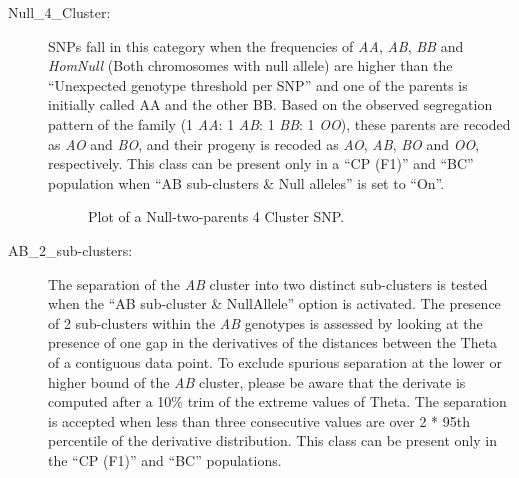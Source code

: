\documentclass[a4paper,11pt,english]{article}
\begin{document}
\begin{description}
\item [Null\_4\_Cluster:] SNPs fall in this category
when the frequencies of \emph{AA}, \emph{AB}, \emph{BB} and \emph{HomNull} 
(Both chromosomes with null allele) are higher than the ``Unexpected genotype threshold per
SNP'' and one of the parents is initially called AA and the other BB. Based on
the observed segregation pattern of the family (1 \emph{AA}: 1 \emph{AB}: 1 \emph{BB}: 1 \emph{OO}),
these parents are recoded
as \emph{AO} and \emph{BO}, and their progeny is  recoded as \emph{AO}, \emph{AB}, \emph{BO} and
\emph{OO}, respectively.
This class can be present only in a ``CP (F1)'' and ``BC'' population when
``AB sub-clusters \& Null alleles'' is set to ``On''.
\begin{figure}[H]
\centering
\capstart

\caption{Plot of a Null-two-parents 4 Cluster SNP.}\end{figure}

\item [AB\_2\_sub-clusters:] The separation of the \emph{AB} cluster into two distinct sub-clusters
is tested when the ``AB sub-cluster \& NullAllele'' option is activated.
The presence of 2 sub-clusters within the \emph{AB}
genotypes is assessed by looking at the presence of one gap in the derivatives of the distances
between the
Theta of a contiguous data point. To exclude spurious separation at the lower or higher
bound of the \emph{AB} cluster, please be aware that the derivate is computed after a 10\% trim of
the extreme values of Theta.
The separation is accepted when less than three consecutive values are over 2 * 95th percentile
of the derivative distribution. This class can be present
only in the ``CP (F1)'' and ``BC'' populations.
\begin{figure}[H]
\centering
\capstart


\end{figure}
\end{description}
\end{document}
